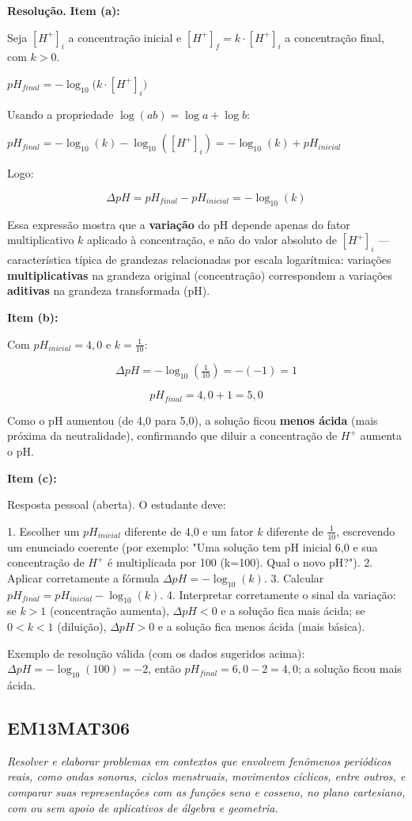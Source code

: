 \documentclass[11pt,a4paper]{article}
\begin{document}
\textbf{Resolução.} \textbf{Item (a):}

Seja $[H^+]_i$ a concentração inicial e $[H^+]_f = k\cdot [H^+]_i$ a concentração final, com $k>0$.

$pH_{final} = -\log_{10}\big(k\cdot [H^+]_i\big)$

Usando a propriedade $\log(ab) = \log a + \log b$:

$pH_{final} = -\log_{10}(k) - \log_{10}([H^+]_i) = -\log_{10}(k) + pH_{inicial}$

Logo:

$$\Delta pH = pH_{final} - pH_{inicial} = -\log_{10}(k)$$

Essa expressão mostra que a \textbf{variação} do pH depende apenas do fator multiplicativo $k$ aplicado à concentração, e não do valor absoluto de $[H^+]_i$ — característica típica de grandezas relacionadas por escala logarítmica: variações \textbf{multiplicativas} na grandeza original (concentração) correspondem a variações \textbf{aditivas} na grandeza transformada (pH).

\textbf{Item (b):}

Com $pH_{inicial} = 4{,}0$ e $k = \tfrac{1}{10}$:

$$\Delta pH = -\log_{10}\left(\tfrac{1}{10}\right) = -(-1) = 1$$

$$pH_{final} = 4{,}0 + 1 = 5{,}0$$

Como o pH aumentou (de 4,0 para 5,0), a solução ficou \textbf{menos ácida} (mais próxima da neutralidade), confirmando que diluir a concentração de $H^+$ aumenta o pH.

\textbf{Item (c):}

Resposta pessoal (aberta). O estudante deve:

1. Escolher um $pH_{inicial}$ diferente de 4,0 e um fator $k$ diferente de $\tfrac{1}{10}$, escrevendo um enunciado coerente (por exemplo: "Uma solução tem pH inicial 6,0 e sua concentração de $H^+$ é multiplicada por 100 (k=100). Qual o novo pH?").
2. Aplicar corretamente a fórmula $\Delta pH = -\log_{10}(k)$.
3. Calcular $pH_{final} = pH_{inicial} - \log_{10}(k)$.
4. Interpretar corretamente o sinal da variação: se $k>1$ (concentração aumenta), $\Delta pH<0$ e a solução fica mais ácida; se $0<k<1$ (diluição), $\Delta pH>0$ e a solução fica menos ácida (mais básica).

Exemplo de resolução válida (com os dados sugeridos acima): $\Delta pH = -\log_{10}(100) = -2$, então $pH_{final} = 6{,}0 - 2 = 4{,}0$; a solução ficou mais ácida.
\subsection*{EM13MAT306}
{\small\itshape Resolver e elaborar problemas em contextos que envolvem fenômenos periódicos reais, como ondas sonoras, ciclos menstruais, movimentos cíclicos, entre outros, e comparar suas representações com as funções seno e cosseno, no plano cartesiano, com ou sem apoio de aplicativos de álgebra e geometria.}
\end{document}
